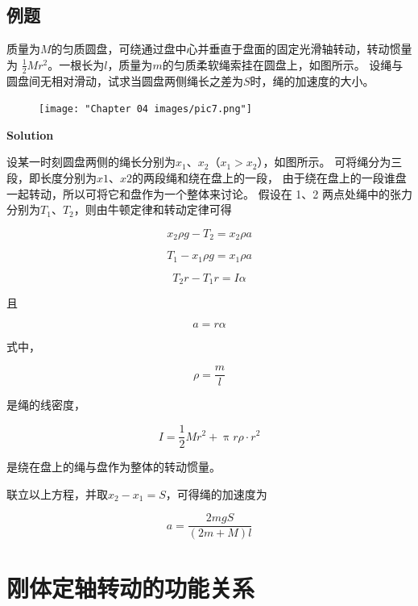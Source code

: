 \documentclass[
	12pt, %
	a4paper, %
]{myLegrandOrangeBook}
\begin{document}
\subsection{例题}

\begin{exercise}
    质量为\(M\)的匀质圆盘，可绕通过盘中心并垂直于盘面的固定光滑轴转动，转动惯量为
    \(\frac{1}{2}Mr^2\)。一根长为\(l\)，质量为\(m\)的匀质柔软绳索挂在圆盘上，如图所示。
    设绳与圆盘间无相对滑动，试求当圆盘两侧绳长之差为\(S\)时，绳的加速度的大小。
    \vspace{1em}
\end{exercise}

    \begin{figure}
        \centering
        \texttt{[image: "Chapter 04 images/pic7.png"]}
        \label{pic4-7}
    \end{figure}

    \textbf{Solution}
    \vspace{1em}

    设某一时刻圆盘两侧的绳长分别为\(x_1\)、\(x_2\)（\(x_1 > x_2\)），如图所示。
    可将绳分为三段，即长度分别为\(x1\)、\(x2\)的两段绳和绕在盘上的一段，
    由于绕在盘上的一段谁盘一起转动，所以可将它和盘作为一个整体来讨论。
    假设在 1、2 两点处绳中的张力分别为\(T_1\)、\(T_2\)，则由牛顿定律和转动定律可得

    \[
        x_2 \rho g - T_2 = x_2 \rho a
    \]

    \[
        T_1 - x_1 \rho g = x_1 \rho a
    \]

    \[
        T_2r - T_1r = I \alpha
    \]

    且

    \[
        a = r\alpha
    \]

    式中，

    \[
        \rho = \frac{m}{l}
    \]

    是绳的线密度，

    \[
        I = \frac{1}{2}Mr^2 + \uppi r \rho \cdot r^2
    \]

    是绕在盘上的绳与盘作为整体的转动惯量。

    联立以上方程，并取\(x_2-x_1=S\)，可得绳的加速度为

    $$
        a=\frac{2 m g S}{(2 m+M) l}
    $$

\section{刚体定轴转动的功能关系}
\end{document}
